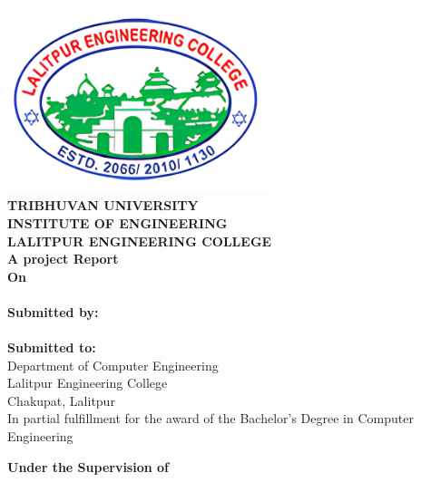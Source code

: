 \begin{center}
    \linespread{1.6}
    \thispagestyle{empty}
    \includegraphics[width= 3in ]{img/leclogo21.png} \\
    \vspace{0.05 in}
    {\fontsize{12 pt}{12} \selectfont\textbf{TRIBHUVAN UNIVERSITY} \\
        \textbf{INSTITUTE OF ENGINEERING} \\
        \textbf{LALITPUR ENGINEERING COLLEGE}} \\

    \vspace{0.5 in}
    \textbf{A project Report}\\
    {\fontsize{12 pt}{12} \selectfont\textbf{On}\\}
    {\fontsize{12 pt}{12} \selectfont \textbf{\thetitle}}\\
    \vspace{0.4 in}
    \textbf{ Submitted by:}  \\
    {\theauthor} \\
    \vspace{0.3 in}
    \textbf{ Submitted to:}  \\
    Department of Computer Engineering \\
    Lalitpur Engineering College \\
    Chakupat, Lalitpur \\

    \vspace{0.2in}
    In partial fulfillment for the award of the
    Bachelor's Degree in Computer Engineering

    \vspace{0.2in}
    \textbf{Under the Supervision of} \\
    \thesupervisor\\
    \vspace{0.2in}
    \thedate

\end{center}

